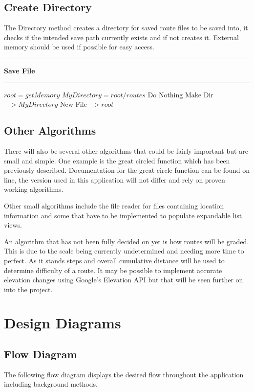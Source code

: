 \subsection{Create Directory}
The Directory method creates a directory for saved route files to be saved into, it checks if the intended save path currently exists and if not creates it. External memory should be used if possible for easy access\cite{storage}. 

\vspace{0.3cm}
\hrule
\vspace{0.2cm}
\textbf{Save File}
\vspace{0.1cm}
\hrule
\vspace{0.1cm}
\begin{algorithmic}[1]
\State $root = get Memory$
\State $My Directory = root/routes$
	\State Do Nothing
	\Else
\State Make Dir $->My Directory$
\EndIf
\State New File$-> root$

\end{algorithmic}
\subsection{Other Algorithms}
There will also be several other algorithms that could be fairly important but are small and simple. One example is the great circled function\cite{circle} which has been previously described. Documentation for the great circle function can be found on line, the version used in this application will not differ and rely on proven working algorithms. 

Other small algorithms include the file reader for files containing location information and some that have to be implemented to populate expandable list views.

An algorithm that has not been fully decided on yet is how routes will be graded. This is due to the scale being currently undetermined and needing more time to perfect. As it stands steps and overall cumulative distance will be used to determine difficulty of a route. It may be possible to implement accurate elevation changes using Google's Elevation API but that will be seen further on into the project. 
\section{Design Diagrams}
\subsection{Flow Diagram}
The following flow diagram displays the desired flow throughout the application including background methods.

